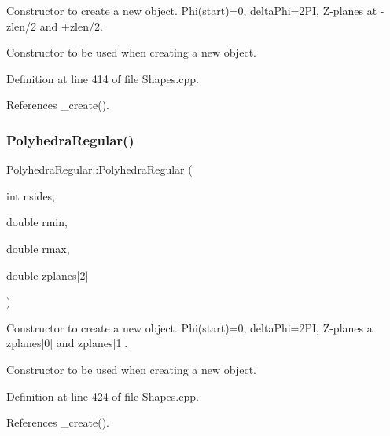 Constructor to create a new object. Phi(start)=0, delta\+Phi=2\+PI, Z-\/planes at -\/zlen/2 and +zlen/2. 

Constructor to be used when creating a new object. 

Definition at line 414 of file Shapes.\+cpp.



References \+\_\+create().

\hypertarget{class_d_d4hep_1_1_geometry_1_1_polyhedra_regular_a0fd96974d56ca2fb51494fc69d9c0443}{}\label{class_d_d4hep_1_1_geometry_1_1_polyhedra_regular_a0fd96974d56ca2fb51494fc69d9c0443} 
\subsubsection{\texorpdfstring{Polyhedra\+Regular()}{PolyhedraRegular()}\hspace{0.1cm}{\footnotesize\ttfamily [6/7]}}
{\footnotesize\ttfamily Polyhedra\+Regular\+::\+Polyhedra\+Regular (\begin{DoxyParamCaption}\item[{int}]{nsides,  }\item[{double}]{rmin,  }\item[{double}]{rmax,  }\item[{double}]{zplanes\mbox{[}2\mbox{]} }\end{DoxyParamCaption})}



Constructor to create a new object. Phi(start)=0, delta\+Phi=2\+PI, Z-\/planes a zplanes\mbox{[}0\mbox{]} and zplanes\mbox{[}1\mbox{]}. 

Constructor to be used when creating a new object. 

Definition at line 424 of file Shapes.\+cpp.



References \+\_\+create().

\hypertarget{class_d_d4hep_1_1_geometry_1_1_polyhedra_regular_a753b26a4ca8dc57fe9f3d1396a9acb81}{}\label{class_d_d4hep_1_1_geometry_1_1_polyhedra_regular_a753b26a4ca8dc57fe9f3d1396a9acb81} 
